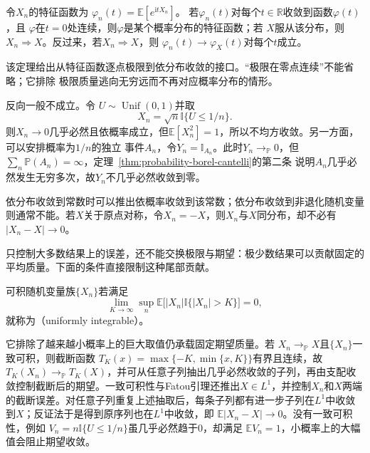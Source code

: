 \begin{theorem}[L\'evy连续性定理]
  \label{thm:probability-levy-continuity}
  令\(X_n\)的特征函数为
  \(\varphi_n(t)=\mathbb{E}[e^{\mathrm{i}tX_n}]\)。
  若\(\varphi_n(t)\)对每个\(t\in\mathbb{R}\)收敛到函数\(\varphi(t)\)，且
  \(\varphi\)在\(t=0\)处连续，则\(\varphi\)是某个概率分布的特征函数；若
  \(X\)服从该分布，则\(X_n\Rightarrow X\)。反过来，若\(X_n\Rightarrow X\)，则
  \(\varphi_n(t)\to\varphi_X(t)\)对每个\(t\)成立。
\end{theorem}

该定理给出从特征函数逐点极限到依分布收敛的接口。“极限在零点连续”不能省略；它排除
极限质量逃向无穷远而不再对应概率分布的情形。

反向一般不成立。令
\(U\sim\operatorname{Unif}(0,1)\)并取
\[ X_n=\sqrt{n}\mathbb{I}\{U\leq1/n\}. \]
则\(X_n\to0\)几乎必然且依概率成立，但\(\mathbb{E}[X_n^2]=1\)，所以不均方收敛。另一方面，可以安排概率为\(1/n\)的独立
事件\(A_n\)，令\(Y_n=\mathbb{I}_{A_n}\)。此时\(Y_n\to_{\mathbb{P}}0\)，但
\(\sum_n\mathbb{P}(A_n)=\infty\)，定理~\ref{thm:probability-borel-cantelli}的第二条
说明\(A_n\)几乎必然发生无穷多次，故\(Y_n\)不几乎必然收敛到零。

依分布收敛到常数时可以推出依概率收敛到该常数；依分布收敛到非退化随机变量则通常不能。若\(X\)关于原点对称，令\(X_n=-X\)，则\(X_n\)与\(X\)同分布，却不必有\(|X_n-X|\to0\)。

只控制大多数结果上的误差，还不能交换极限与期望：极少数结果可以贡献固定的平均质量。下面的条件直接限制这种尾部贡献。
\begin{definition}[一致可积]
  \label{def:probability-uniform-integrability}
可积随机变量族\(\{X_n\}\)若满足
\[
  \lim_{K\to\infty}
  \sup_n\mathbb{E}\bigl[
    |X_n|\mathbb{I}\{|X_n|>K\}
  \bigr]=0,
\]
就称为（uniformly integrable）。
\end{definition}
它排除了越来越小概率上的巨大取值仍承载固定期望质量。若
\(X_n\to_{\mathbb{P}}X\)且\(\{X_n\}\)一致可积，则截断函数
\(T_K(x)=\max\{-K,\min\{x,K\}\}\)有界且连续，故
\(T_K(X_n)\to_{\mathbb{P}}T_K(X)\)，并可从任意子列抽出几乎必然收敛的子列，再由支配收敛控制截断后的期望。一致可积性与Fatou引理还推出\(X\in L^1\)，并控制\(X_n\)和\(X\)两端的截断误差。对任意子列重复上述抽取后，每条子列都有进一步子列在\(L^1\)中收敛到\(X\)；反证法于是得到原序列也在\(L^1\)中收敛，即
\(\mathbb{E}|X_n-X|\to0\)。没有一致可积性，例如
\(V_n=n\mathbb{I}\{U\leq1/n\}\)虽几乎必然趋于\(0\)，却满足
\(\mathbb{E}V_n=1\)，小概率上的大幅值会阻止期望收敛。

